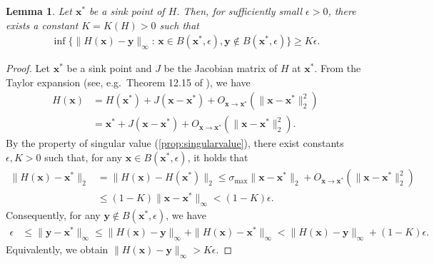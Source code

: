 \documentclass[letterpaper,11pt]{article}
\newtheorem{lemma}[theorem]{Lemma}
\begin{document}
\begin{lemma} \label{lem:sinkdistance}
Let $\mathbf{x}^*$ be a sink point of $H$.
Then, for sufficiently small $\epsilon>0$, there exists a constant $K=K(H)>0$ such that
\begin{align*}
\inf\{\|H(\mathbf{x})-\mathbf{y}\|_\infty:\,\mathbf{x}\in B(\mathbf{x}^*,\epsilon),\mathbf{y}\not\in B(\mathbf{x}^*,\epsilon)\}\geq K\epsilon.
\end{align*}
\end{lemma}
\begin{proof}
Let $\mathbf{x}^*$ be a sink point and $J$ be the Jacobian matrix of $H$ at $\mathbf{x}^*$.
From the Taylor expansion (see, e.g.~Theorem 12.15 of \cite{Krantz16}), we have
\begin{align}
H(\mathbf{x})&=H(\mathbf{x}^*)+J(\mathbf{x}-\mathbf{x}^*)+O_{\mathbf{x}\to\mathbf{x}^*}(\|\mathbf{x}-\mathbf{x}^*\|_2^2) \nonumber\\
&=\mathbf{x}^*+J(\mathbf{x}-\mathbf{x}^*)+O_{\mathbf{x}\to\mathbf{x}^*}(\|\mathbf{x}-\mathbf{x}^*\|_2^2). \label{eqn:Taylorexpansion}
\end{align}
By the property of singular value (\cref{prop:singularvalue}), there exist constants $\epsilon,K>0$ such that, for any $\mathbf{x}\in B(\mathbf{x}^*,\epsilon)$, it holds that
\begin{align*}
\|H(\mathbf{x})-\mathbf{x}^*\|_2&=\|H(\mathbf{x})-H(\mathbf{x}^*)\|_2
\leq \sigma_{\max}\|\mathbf{x}-\mathbf{x}^*\|_2+O_{\mathbf{x}\to\mathbf{x}^*}(\|\mathbf{x}-\mathbf{x}^*\|_2^2)\\
&\leq(1-K)\|\mathbf{x}-\mathbf{x}^*\|_\infty
<(1-K)\epsilon.
\end{align*}
Consequently, for any $\mathbf{y}\not\in B(\mathbf{x}^*,\epsilon)$, we have
\begin{align*}
\epsilon&\leq \|\mathbf{y}-\mathbf{x}^*\|_\infty
\leq \|H(\mathbf{x})-\mathbf{y}\|_\infty+\|H(\mathbf{x})-\mathbf{x}^*\|_\infty
< \|H(\mathbf{x})-\mathbf{y}\|_\infty+(1-K)\epsilon.
\end{align*}
Equivalently, we obtain $\|H(\mathbf{x})-\mathbf{y}\|_\infty>K\epsilon$.
\end{proof}
\end{document}
